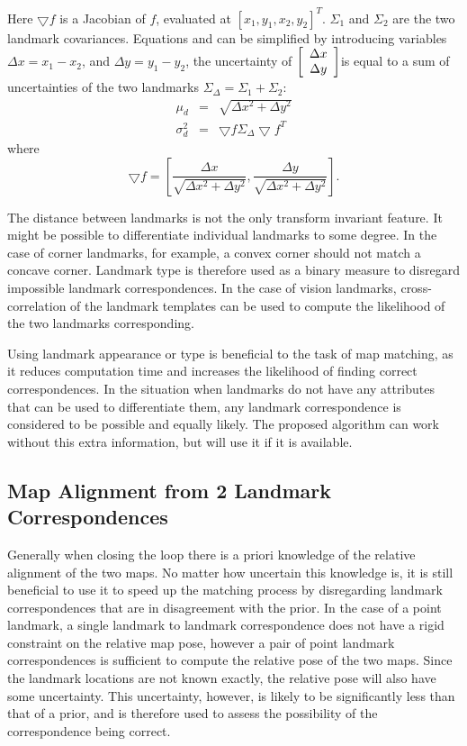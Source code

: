 Here $\bigtriangledown f$ is a Jacobian of $f$, evaluated at
$[x_1,y_1,x_2,y_2]^T$. $\Sigma_1$ and $\Sigma_2$ are the two landmark
covariances. Equations  and
 can be simplified by introducing
variables $\Delta x = x_1 - x_2$, and $\Delta y = y_1 - y_2$, the
uncertainty of $\left[\begin{array}{c} \Delta x\\ \Delta y \end{array} \right]$is equal to a sum of
uncertainties of the two landmarks $\Sigma_\Delta = \Sigma_1 +
\Sigma_2$:
\begin{eqnarray}
\mu_d &=& \sqrt{\Delta x^2 +\Delta y^2}\\
\sigma_d^2 &=& \bigtriangledown f \Sigma_\Delta \bigtriangledown f^T
\end{eqnarray}
where
$$ 
\bigtriangledown f = \left[
\frac{\Delta x}{\sqrt{\Delta x^2 + \Delta y^2}}, 
\frac{\Delta y}{\sqrt{\Delta x^2 + \Delta y^2}}
\right].
$$


The distance between landmarks is not the only transform invariant
feature. It might be possible to differentiate individual landmarks to
some degree. In the case of corner landmarks, for example, a convex
corner should not match a concave corner. Landmark type is therefore
used as a binary measure to disregard impossible landmark
correspondences. In the case of vision landmarks, cross-correlation of
the landmark templates can be used to compute the likelihood of the
two landmarks corresponding.

Using landmark appearance or type is beneficial to the task of map
matching, as it reduces computation time and increases the likelihood
of finding correct correspondences. In the situation when landmarks do
not have any attributes that can be used to differentiate them, any
landmark correspondence is considered to be possible and equally
likely. The proposed algorithm can work without this extra
information, but will use it if it is available.

\subsection{Map Alignment from 2 Landmark Correspondences}

Generally when closing the loop there is a priori knowledge of the
relative alignment of the two maps. No matter how uncertain this
knowledge is, it is still beneficial to use it to speed up the
matching process by disregarding landmark correspondences that are in
disagreement with the prior. In the case of a point landmark, a single
landmark to landmark correspondence does not have a rigid constraint
on the relative map pose, however a pair of point landmark
correspondences is sufficient to compute the relative pose of the two
maps. Since the landmark locations are not known exactly, the relative
pose will also have some uncertainty. This uncertainty, however, is
likely to be significantly less than that of a prior, and is therefore
used to assess the possibility of the correspondence being
correct.

